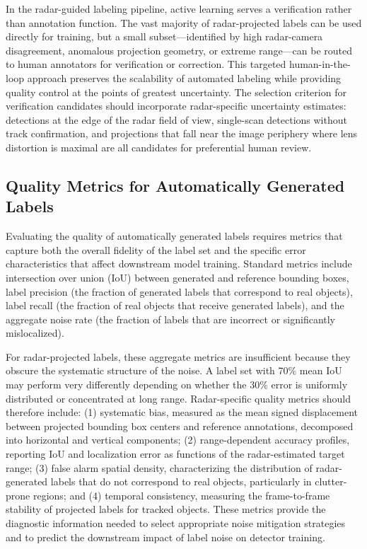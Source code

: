 In the radar-guided labeling pipeline, active learning serves a verification rather than annotation function. The vast majority of radar-projected labels can be used directly for training, but a small subset---identified by high radar-camera disagreement, anomalous projection geometry, or extreme range---can be routed to human annotators for verification or correction. This targeted human-in-the-loop approach preserves the scalability of automated labeling while providing quality control at the points of greatest uncertainty. The selection criterion for verification candidates should incorporate radar-specific uncertainty estimates: detections at the edge of the radar field of view, single-scan detections without track confirmation, and projections that fall near the image periphery where lens distortion is maximal are all candidates for preferential human review.

\subsection{Quality Metrics for Automatically Generated Labels}\label{subsec:quality_metrics}

Evaluating the quality of automatically generated labels requires metrics that capture both the overall fidelity of the label set and the specific error characteristics that affect downstream model training. Standard metrics include intersection over union (IoU) between generated and reference bounding boxes, label precision (the fraction of generated labels that correspond to real objects), label recall (the fraction of real objects that receive generated labels), and the aggregate noise rate (the fraction of labels that are incorrect or significantly mislocalized).

For radar-projected labels, these aggregate metrics are insufficient because they obscure the systematic structure of the noise. A label set with 70\% mean IoU may perform very differently depending on whether the 30\% error is uniformly distributed or concentrated at long range. Radar-specific quality metrics should therefore include: (1) systematic bias, measured as the mean signed displacement between projected bounding box centers and reference annotations, decomposed into horizontal and vertical components; (2) range-dependent accuracy profiles, reporting IoU and localization error as functions of the radar-estimated target range; (3) false alarm spatial density, characterizing the distribution of radar-generated labels that do not correspond to real objects, particularly in clutter-prone regions; and (4) temporal consistency, measuring the frame-to-frame stability of projected labels for tracked objects. These metrics provide the diagnostic information needed to select appropriate noise mitigation strategies and to predict the downstream impact of label noise on detector training.

